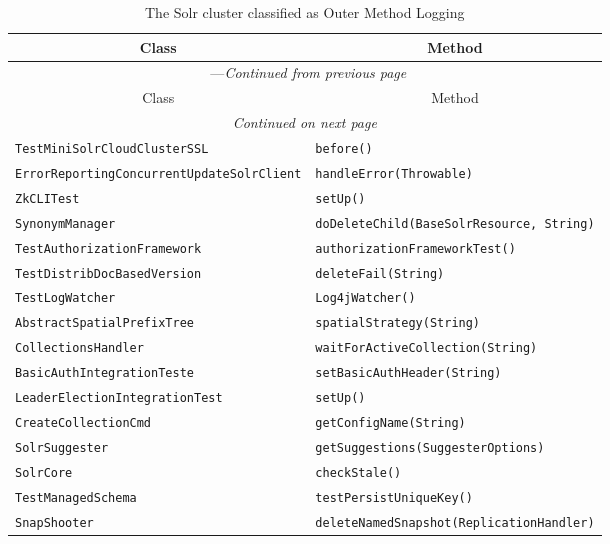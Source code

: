 \begin{center}
\begin{longtable}{ll}
\caption{The Solr cluster classified as Outer Method Logging}\\
\toprule\multicolumn{1}{c}{Class}&\multicolumn{1}{c}{Method}\\\midrule
\endfirsthead

\multicolumn{2}{c}{\tablename\ \thetable{}---\textit{Continued from previous page}} \\\midrule
\multicolumn{1}{c}{Class}&\multicolumn{1}{c}{Method}\\\midrule
\endhead
\multicolumn{2}{c}{\textit{Continued on next page}}\\\midrule
\endfoot
\bottomrule
\endlastfoot

\lstinline/TestMiniSolrCloudClusterSSL/&{\lstinline/before()/}\\
\lstinline/ErrorReportingConcurrentUpdateSolrClient/&{\lstinline/handleError(Throwable)/}\\
\lstinline/ZkCLITest/&{\lstinline/setUp()/}\\
\lstinline/SynonymManager/&{\lstinline/doDeleteChild(BaseSolrResource, String)/}\\
\lstinline/TestAuthorizationFramework/&{\lstinline/authorizationFrameworkTest()/}\\
\lstinline/TestDistribDocBasedVersion/&{\lstinline/deleteFail(String)/}\\
\lstinline/TestLogWatcher/&{\lstinline/Log4jWatcher()/}\\
\lstinline/AbstractSpatialPrefixTree/&{\lstinline/spatialStrategy(String)/}\\
\lstinline/CollectionsHandler/&{\lstinline/waitForActiveCollection(String)/}\\
\lstinline/BasicAuthIntegrationTeste/&{\lstinline/setBasicAuthHeader(String)/}\\
\lstinline/LeaderElectionIntegrationTest/&{\lstinline/setUp()/}\\
\lstinline/CreateCollectionCmd/&{\lstinline/getConfigName(String)/}\\
\lstinline/SolrSuggester/&{\lstinline/getSuggestions(SuggesterOptions)/}\\
\lstinline/SolrCore/&{\lstinline/checkStale()/}\\
\lstinline/TestManagedSchema/&{\lstinline/testPersistUniqueKey()/}\\
\lstinline/SnapShooter/&{\lstinline/deleteNamedSnapshot(ReplicationHandler)/}\\

\end{longtable}
\end{center}
